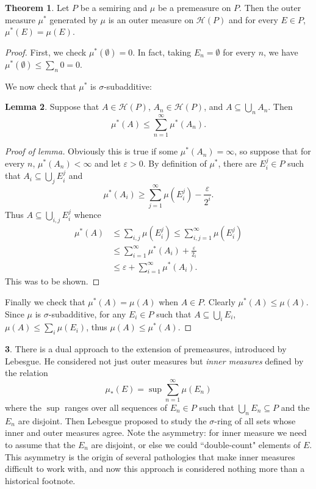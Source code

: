 \documentclass[12pt]{book}
\newcommand{\dfn}[1]{\emph{#1}\index{#1}}
\theoremstyle{definition}
\newtheorem{theorem}{Theorem}[section]
\newtheorem{lemma}[theorem]{Lemma}
\newtheorem{subsec}[theorem]{}
\begin{document}
\begin{theorem}
Let $P$ be a semiring and $\mu$ be a premeasure on $P$. Then the outer measure $\mu^*$ generated by $\mu$ is an outer measure on $\mathcal H(P)$ and for every $E \in P$, $\mu^*(E) = \mu(E)$.
\end{theorem}
\begin{proof}
First, we check $\mu^*(\emptyset) = 0$. In fact, taking $E_n = \emptyset$ for every $n$, we have $\mu^*(\emptyset) \leq \sum_n 0 = 0$.

We now check that $\mu^*$ is $\sigma$-subadditive:
\begin{lemma}
Suppose that $A \in \mathcal H(P)$, $A_n \in \mathcal H(P)$, and $A \subseteq \bigcup_n A_n$. Then
$$\mu^*(A) \leq \sum_{n=1}^\infty \mu^*(A_n).$$
\end{lemma}
\begin{proof}[Proof of lemma]
Obviously this is true if some $\mu^*(A_n) = \infty$, so suppose that for every $n$, $\mu^*(A_n) < \infty$ and let $\varepsilon > 0$.
By definition of $\mu^*$, there are $E_i^j \in P$ such that $A_i \subseteq \bigcup_j E_i^j$
and
$$\mu^*(A_i) \geq \sum_{j=1}^\infty \mu(E_i^j) - \frac{\varepsilon}{2^i}.$$
Thus $A \subseteq \bigcup_{i,j}E_i^j$ whence
\begin{align*}\mu^*(A) &\leq \sum_{i,j} \mu(E_i^j) \leq \sum_{i,j=1}^\infty \mu(E_i^j)\\ &\leq \sum_{i=1}^\infty \mu^*(A_i) + \frac{\varepsilon}{2_i}\\& \leq \varepsilon + \sum_{i=1}^\infty \mu^*(A_i).\end{align*}
This was to be shown.
\end{proof}

Finally we check that $\mu^*(A) = \mu(A)$ when $A \in P$. Clearly $\mu^*(A) \leq \mu(A)$.
Since $\mu$ is $\sigma$-subadditive, for any $E_i \in P$ such that $A \subseteq \bigcup_i E_i$, $\mu(A) \leq \sum_i \mu(E_i)$, thus $\mu(A) \leq \mu^*(A)$.
\end{proof}

\begin{subsec}
There is a dual approach to the extension of premeasures, introduced by Lebesgue.
He considered not just outer measures but \dfn{inner measures} defined by the relation
$$\mu_*(E) = \sup \sum_{n=1}^\infty \mu(E_n)$$
where the $\sup$ ranges over all sequences of $E_n \in P$ such that $\bigcup_n E_n \subseteq P$ and the $E_n$ are disjoint.
Then Lebesgue proposed to study the $\sigma$-ring of all sets whose inner and outer measures agree.
Note the asymmetry: for inner measure we need to assume that the $E_n$ are disjoint, or else we could ``double-count" elements of $E$.
This asymmetry is the origin of several pathologies that make inner measures difficult to work with, and now this approach is considered nothing more than a historical footnote.
\end{subsec}
\end{document}

